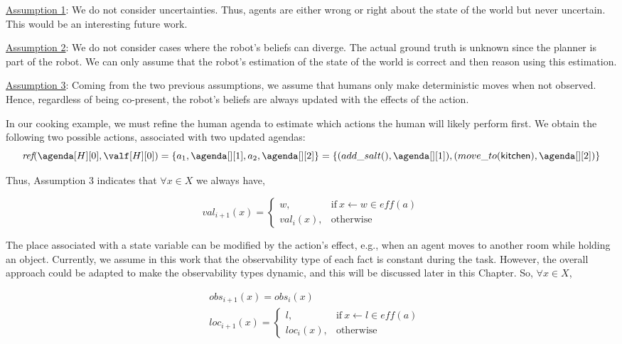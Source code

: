 {\underline{Assumption 1}: We do not consider uncertainties. Thus, agents are either wrong or right about the state of the world but never uncertain. This would be an interesting future work. 

\underline{Assumption 2}: We do not consider cases where the robot's beliefs can diverge. The actual ground truth is unknown since the planner is part of the robot. We can only assume that the robot's estimation of the state of the world is correct and then reason using this estimation.

\underline{Assumption 3}: Coming from the two previous assumptions, we assume that humans only make deterministic moves when not observed. Hence, regardless of being co-present, the robot's beliefs are always updated with the effects of the action.

In our cooking example, we must refine the human agenda to estimate which actions the human will likely perform first. We obtain the following two possible actions, associated with two updated agendas:\\
{\small
\begin{equation*}
    \textit{ref}(\agenda[H][0], \valf[H][0]) = \{ a_1,\agenda[][1], a_2,\agenda[][2] \}= \{ (add\_salt(),\agenda[][1]), (move\_to(\textsf{kitchen}),\agenda[][2]) \}
\end{equation*}
}

Thus, Assumption 3 indicates that $\forall x \in X$ we always have,

\begin{equation}
    val_{i+1}(x) = \left\{ 
    \begin{array}{ll}
        w, & \mbox{if} ~ x \leftarrow w \in \textit{eff}(a)   \\ 
        val_i(x), & \mbox{otherwise}
    \end{array}\right.
\end{equation}

The place associated with a state variable can be modified by the action's effect, e.g., when an agent moves to another room while holding an object. 
Currently, we assume in this work that the observability type of each fact is constant during the task. 
However, the overall approach could be adapted to make the observability types dynamic, and this will be discussed later in this Chapter.
So, $\forall x \in X$,

\begin{align}
    &obs_{i+1}(x) = obs_i(x)\\
    &loc_{i+1}(x) = \left\{ 
    \begin{array}{ll}
        l, & \mbox{if} ~ x \leftarrow l \in \textit{eff}(a)\\
        loc_i(x), & \mbox{otherwise}
    \end{array}\right.
\end{align}

}
